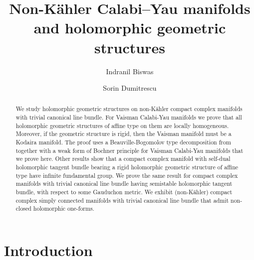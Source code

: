 \documentclass[12pt,reqno]{amsart}
\theoremstyle{definition}
\numberwithin{equation}{section}
\begin{document}
\baselineskip=15.5pt

\title[Non-K\"ahler Calabi--Yau manifolds]{Non-K\"ahler Calabi--Yau manifolds and
holomorphic geometric structures}

\author[I. Biswas]{Indranil Biswas}

\address{Department of Mathematics, Shiv Nadar University, NH91, Tehsil Dadri,
Greater Noida, Uttar Pradesh 201314, India}


\author[S. Dumitrescu]{Sorin Dumitrescu}

\address{Universit\'e C\^ote d'Azur, CNRS, LJAD, France}




\date{}

\begin{abstract}
We study holomorphic geometric structures on non-K\"ahler compact complex manifolds with trivial canonical 
line bundle. For Vaisman Calabi-Yau manifolds we prove that all holomorphic geometric structures of affine 
type on them are locally homogeneous. Moreover, if the geometric structure is rigid, then the Vaisman 
manifold must be a Kodaira manifold. The proof uses a Beauville-Bogomolov type decomposition from \cite{Is} 
together with a weak form of Bochner principle for Vaisman Calabi-Yau manifolds that we prove here. Other 
results show that a compact complex manifold with self-dual holomorphic tangent bundle bearing a rigid 
holomorphic geometric structure of affine type have infinite fundamental group. We prove the same result for 
compact complex manifolds with trivial canonical line bundle having semistable holomorphic tangent bundle, 
with respect to some Gauduchon metric. We exhibit (non-K\"ahler) compact complex simply connected manifolds 
with trivial canonical line bundle that admit non-closed holomorphic one-forms.
\end{abstract}

\maketitle

\tableofcontents

\section{Introduction}
\end{document}
